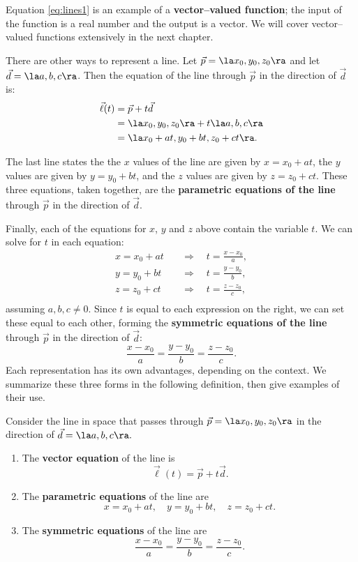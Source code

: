 Equation \eqref{eq:lines1} is an example of a \textbf{vector--valued function}; the input of the function is a real number and the output is a vector. We will cover vector--valued functions extensively in the next chapter.

There are other ways to represent a line. Let $\vec p = \la x_0,y_0,z_0\ra$ and let $\vec d = \la a,b,c\ra$. Then the equation of the line through $\vec p$ in the direction of $\vec d$ is:
\begin{align*}
\vec\ell(t) &= \vec p + t\vec d \\
						&= \la x_0,y_0,z_0\ra + t\la a,b,c\ra \\
						&= \la x_0 + at, y_0+bt, z_0+ct\ra.
\end{align*}

The last line states the the $x$ values of the line are given by $x=x_0+at$, the $y$ values are given by $y = y_0+bt$, and the $z$ values are given by $z = z_0 + ct$. These three equations, taken together, are the \textbf{parametric equations of the line} through $\vec p$ in the direction of $\vec d$.

Finally, each of the equations for $x$, $y$ and $z$ above contain the variable $t$. We can solve for $t$ in each equation:
\begin{align*}
x = x_0+at \quad&\Rightarrow\quad t=\frac{x-x_0}{a},\\
y=y_0+bt \quad&\Rightarrow\quad t = \frac{y-y_0}{b},\\
z = z_0+ct \quad&\Rightarrow\quad t = \frac{z-z_0}{c},\\
\end{align*}
assuming $a,b,c\neq 0$.
Since $t$ is equal to each expression on the right, we can set these equal to each other, forming the \textbf{symmetric equations of the line} through $\vec p$ in the direction of $\vec d$:
\[
\frac{x-x_0}{a} = \frac{y-y_0}{b}=\frac{z-z_0}{c}.
\]
Each representation has its own advantages, depending on the context. We summarize these three forms in the following definition, then give examples of their use.

{Consider the line in space that passes through $\vec p = \la x_0,y_0,z_0\ra$ in the direction of $\vec d = \la a,b,c\ra.$
\begin{enumerate}
	\item The \textbf{vector equation} of the line is 
	\[
	\vec \ell(t) = \vec p+t\vec d.
	\]
	\item	The \textbf{parametric equations} of the line are
	\[
	x = x_0+at, \quad y=y_0+bt, \quad z = z_0+ct .
	\]
	\item	The \textbf{symmetric equations} of the line are
	\[
	\frac{x-x_0}{a} = \frac{y-y_0}{b}=\frac{z-z_0}{c}.
	\]
\end{enumerate}
}

